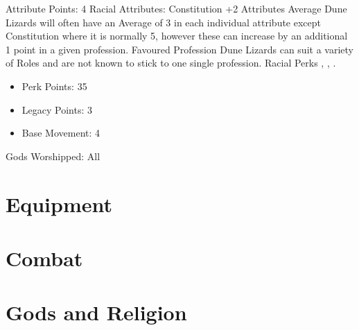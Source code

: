 \documentclass[12pt]{article}
\begin{document}
\begin{multicols}{2}
\begin{itemize}
\end{itemize}
Attribute Points: 4
Racial Attributes: Constitution +2
Attributes Average
Dune Lizards will often have an Average of 3 in each individual attribute except Constitution where it is normally 5, however these can increase by an additional 1 point in a given profession.
Favoured Profession
Dune Lizards can suit a variety of Roles and are not known to stick to one single profession.
Racial Perks
, , .
\begin{itemize}
\item Perk Points: 35
\item Legacy Points: 3
\item Base Movement: 4
\end{itemize}
Gods Worshipped: All
\end{multicols}
\newpage
		\newpage
		\newpage
	\newpage
			\newpage
\section{Equipment}
\section{Combat}
\section{Gods and Religion}











\newpage
\printindex
\end{document}
